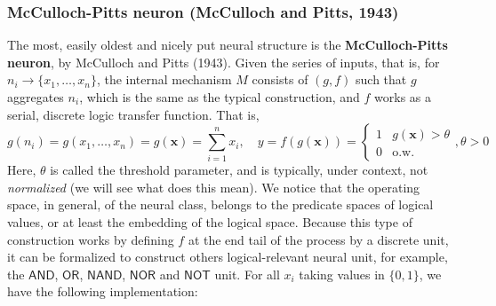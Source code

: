 \subsubsection{McCulloch-Pitts neuron (McCulloch and Pitts, 1943)}
The most, easily oldest and nicely put neural structure is the \textbf{McCulloch-Pitts neuron}, by McCulloch and Pitts (1943). Given the series of inputs, that is, for $n_i \to \{x_1,\dots,x_n\}$, the internal mechanism $M$ consists of $(g,f)$ such that $g$ aggregates $n_{i}$, which is the same as the typical construction, and $f$ works as a serial, discrete logic transfer function. That is, 
\begin{equation*}
    g(n_i) = g(x_1,\dots,x_n) = g(\mathbf{x}) = \sum_{i=1}^{n} x_{i}, \quad y= f(g(\mathbf{x})) = \begin{cases}
        1 & g(\mathbf{x}) > \theta \\
        0 & \text{o.w.}
    \end{cases}, \theta > 0
\end{equation*}
Here, $\theta$ is called the threshold parameter, and is typically, under context, not \textit{normalized} (we will see what does this mean). We notice that the operating space, in general, of the neural class, belongs to the predicate spaces of logical values, or at least the embedding of the logical space. Because this type of construction works by defining $f$ at the end tail of the process by a discrete unit, it can be formalized to construct others logical-relevant neural unit, for example, the $\mathsf{AND}$, $\mathsf{OR}$, $\mathsf{NAND}$, $\mathsf{NOR}$ and $\mathsf{NOT}$ unit. For all $x_{i}$ taking values in $\{0,1\}$, we have the following implementation:

